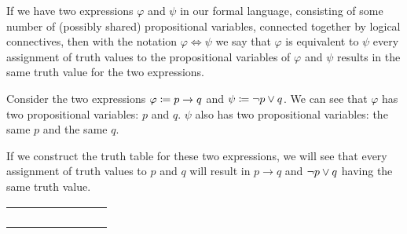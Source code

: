 \begin{definition}[Equivalence]
    If we have two expressions $\varphi$ and $\psi$ in our formal language,
    consisting of some number of (possibly shared) propositional variables, connected together by logical connectives,
    then with the notation $\varphi \iff \psi$ we say that $\varphi$ is equivalent to $\psi$
    \iffbydefn every assignment of truth values to the propositional variables of $\varphi$ and $\psi$ results
    in the same truth value for the two expressions.
\end{definition}
\begin{example}
    Consider the two expressions $\varphi \coloneqq p \rightarrow q$ and $\psi \coloneqq \neg p \vee q$.
    We can see that $\varphi$ has two propositional variables: $p$ and $q$.
    $\psi$ also has two propositional variables: the same $p$ and the same $q$.

    If we construct the truth table for these two expressions,
    we will see that every assignment of truth values to $p$ and $q$ will result in $p \rightarrow q$ and $\neg p \vee q$
    having the same truth value.

    \begin{table}[H]
        \centering
        \label{tab:implies}
        \begin{tabular}{|CcCc||CcCc|}
            \hline
             &  &  & \\ \hline
            \thead{$\top$} & \thead{$\top$} &  & \\
            \thead{$\top$} & \thead{$\bot$} &  & \\
            \thead{$\bot$} & \thead{$\top$} &  & } \\
            \thead{$\bot$} & \thead{$\bot$} & \cellcolor{green!30!white}{\thead{$\top$}} & \cellcolor{green!30!white}{\thead{$\top$}} \\ \hline
        \end{tabular}
    \end{table}
\end{example}

